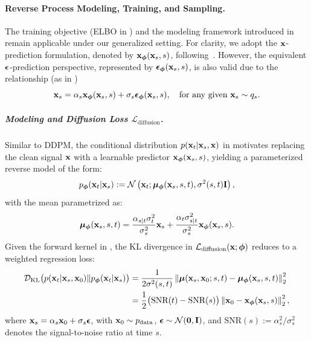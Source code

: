 \paragraph{Reverse Process Modeling, Training, and Sampling.}  
The training objective (ELBO in ) and the modeling framework introduced in  remain applicable under our generalized setting. For clarity, we adopt the ${\mathbf{x}}$-prediction formulation, denoted by ${\mathbf{x}}_{\bm{\phi}}({\mathbf{x}}_s, s)$, following~\citet{kingma2021variational}. However, the equivalent ${\bm{\epsilon}}$-prediction perspective, represented by $\bm{\epsilon}_{\bm{\phi}}({\mathbf{x}}_s, s)$, is also valid due to the relationship (as in )
\[
{\mathbf{x}}_s = \alpha_s {\mathbf{x}}_{\bm{\phi}}({\mathbf{x}}_s, s) + \sigma_s \bm{\epsilon}_{\bm{\phi}}({\mathbf{x}}_s, s),\quad \text{for any given } {\mathbf{x}}_s \sim q_s.
\]

\subparagraph{Modeling and Diffusion Loss $\mathcal{L}_{\text{diffusion}}$.}  
Similar to DDPM, the conditional distribution $p({\mathbf{x}}_t|{\mathbf{x}}_s, {\mathbf{x}})$ in  motivates replacing the clean signal ${\mathbf{x}}$ with a learnable predictor ${\mathbf{x}}_{\bm{\phi}}({\mathbf{x}}_s, s)$, yielding a parameterized reverse model of the form:
\begin{align}\label{eq:general-ddpm-sampling}
    p_{\bm{\phi}}({\mathbf{x}}_t | {\mathbf{x}}_s) := \mathcal{N}\left({\mathbf{x}}_t; \bm{\mu}_{\bm{\phi}}({\mathbf{x}}_s, s, t), \sigma^2(s,t) \mathbf{I}\right),
\end{align}
with the mean parametrized as:
\[
    \bm{\mu}_{\bm{\phi}}({\mathbf{x}}_s, s, t) = \frac{\alpha_{s|t} \sigma_t^2}{\sigma_s^2} {\mathbf{x}}_s + \frac{\alpha_t \sigma_{s|t}^2}{\sigma_s^2} {\mathbf{x}}_{\bm{\phi}}({\mathbf{x}}_s, s).
\]
Given the forward kernel in , the KL divergence in $\mathcal{L}_{\text{diffusion}}({\mathbf{x}}; \bm{\phi})$ reduces to a weighted regression loss:
\begin{align}
\begin{aligned}
    \label{eq:snr-kl}
    \mathcal{D}_{\text{KL}}\big(p({\mathbf{x}}_t|{\mathbf{x}}_s, {\mathbf{x}}_0)  \| p_{\bm{\phi}}({\mathbf{x}}_t|{\mathbf{x}}_s)\big)  
    &= \frac{1}{2\sigma^2(s,t)} \left\| \bm{\mu}({\mathbf{x}}_s, {\mathbf{x}}_0; s,t) - \bm{\mu}_{\bm{\phi}}({\mathbf{x}}_s, s, t) \right\|_2^2 \\
    &= \frac{1}{2} \big(\text{SNR}(t) - \text{SNR}(s)\big) \left\| {\mathbf{x}}_0 - {\mathbf{x}}_{\bm{\phi}}({\mathbf{x}}_s, s) \right\|_2^2,
\end{aligned}
\end{align}
where ${\mathbf{x}}_s = \alpha_s{\mathbf{x}}_0 + \sigma_s\bm{\epsilon}$, with ${\mathbf{x}}_0 \sim p_{\mathrm{data}}$, $\bm{\epsilon} \sim \mathcal{N}(\bm{0}, {\mathbf{I}})$, and $\text{SNR}(s) := \alpha_s^2 / \sigma_s^2$ denotes the signal-to-noise ratio at time $s$.


